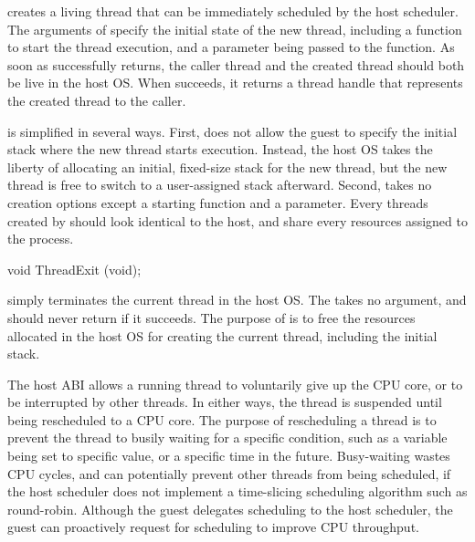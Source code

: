  creates a living thread that can be immediately
scheduled by the host scheduler.
The arguments of  specify the initial state of the new thread, including a function to start the thread execution, and a parameter being passed to the function.
As soon as  successfully returns,
the caller thread and the created thread should both be live in the host OS.
When  succeeds, it returns a thread handle that represents the created thread
to the caller.




 is simplified in several ways.
First,  does not allow the guest to specify
the initial stack where the new thread starts execution.
Instead, the host OS takes the liberty of allocating an initial, fixed-size stack for the new thread,
but the new thread is free to
switch to a user-assigned stack afterward.
Second,  takes no creation options
except a starting function and a parameter.
Every threads created by  should look identical to the host,
and share every resources assigned to the process.



\begin{paldef}
void ThreadExit (void);
\end{paldef}

 simply terminates the current thread in the host OS. The \hostapi{} takes no argument, and should never return if it succeeds.
The purpose of  is to free the resources allocated in the host OS
for creating the current thread, including the initial stack.








The host ABI allows a running thread to voluntarily give up the CPU core,
or to be interrupted by other threads.
In either ways, the thread is suspended until being rescheduled
to a CPU core.
The purpose of rescheduling a thread is to prevent the thread to busily waiting for a specific condition,
such as a variable being set to specific value, or a specific time in the future.
Busy-waiting wastes CPU cycles,
and can potentially prevent other threads from being scheduled, if the host scheduler does not
implement a time-slicing scheduling algorithm such as round-robin.
Although the guest delegates scheduling to the host scheduler, the guest can proactively request for scheduling to improve CPU throughput.



